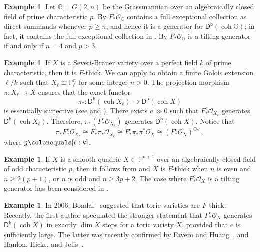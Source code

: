 \documentclass{amsart}
\newcommand{\coh}{\operatorname{coh}}
\newcommand{\dbcat}[1]{\cat{D}^{\mathsf{b}}(#1)}
\newcommand{\mco}{\mathcal{O}}
\newcommand{\cat}[1]{{\mathsf{#1}}}
\theoremstyle{definition}
\newtheorem{example}[subsection]{Example}
\theoremstyle{remark}
\numberwithin{equation}{subsection}
\begin{document}
\begin{example}
Let $\mathbb{G}=G(2,n)$ be the Grassmannian over an algebraically closed field of prime characteristic $p$. By \cite[Corollary~16.11]{Raedschelders/Spenko/VandenBergh:2019} $F_* \mco_\mathbb{G}$ contains a full exceptional collection as direct summands whenever $p\geq n$, and hence it is a generator for $\dbcat{\coh \mathbb{G}}$; in fact, it contains the full exceptional collection in \cite{kaneda2,kaneda1}. By \cite[Theorem~1.1]{Raedschelders/Spenko/VandenBergh:2019} $F_* \mco_\mathbb{G}$ is a tilting generator if and only if $n=4$ and $p>3$.
\end{example}

\begin{example}\label{ex:severi_brauer_f_thick}
If $X$ is a Severi-Brauer variety over a perfect field $k$ of prime characteristic, then it is $F$-thick. We can apply \cite[Corollary~5.1.5]{Gille/Szamuely:2017} to obtain a finite Galois extension $\ell/k$ such that $X_{\ell}\cong \mathbb{P}^n_\ell$ for some integer $n>0$. The projection morphism $\pi\colon X_{\ell} \to X$ ensures that the exact functor
\[
\pi_* \colon \dbcat{\coh{X_{\ell}}} \to \dbcat{\coh{X}}
\]
is essentially surjective (see \cite{Sosna:2013} and \cite{Ballard/Duncan/McFaddin:2019}). There exists $e \gg 0$ such that $F_*^e \mco_{X_{\ell}}$ generates $\dbcat{\coh{X}_\ell}$. Therefore, $\pi_* (F_*^e \mco_{X_\ell})$ generates $\dbcat{\coh X}$. Notice that
\[
\pi_* F_*^e \mco_{X_\ell} \cong F_*^e \pi_* \mco_{X_\ell} \cong F_*^e \pi_* \pi^* \mco_X \cong (F_*^e \mco_X)^{\oplus g}\,,
\]
where $g\colonequals [\ell:k]$.
\end{example}

\begin{example}\label{ex:quadrics_f_thick}
If $X$ is a smooth quadric $X\subset \mathbb{P}^{n+1}$ over an algebraically closed field of odd characteristic $p$, then it follows from \cite[Corollary~5.2]{frob_flag_1} and \cite[Theorem~2]{Achinger:2012} $X$ is $F$-thick when $n$ is even and $n\geq 2(p+1)$, or $n$ is odd and $n \geq 3p+2$. The case where $F_*^e \mco_X$ is a tilting generator has been considered in \cite[Theorem~0.1]{Langer:2008}.
\end{example}

\begin{example}\label{ex:toric varieties}
In 2006, Bondal~\cite{Bondal:Fthick} suggested that toric varieties are $F$-thick. Recently, the first author speculated the stronger statement that $F_\ast^e \mco_X$ generates $\dbcat{\coh X}$ in exactly $\dim X$ steps for a toric variety $X$, provided that $e$ is sufficiently large. 
The latter was recently confirmed by Favero and Huang~\cite{FH:toric}, and Hanlon, Hicks, and Jeffs~\cite{HHL:toric}. 
\end{example}
\end{document}
